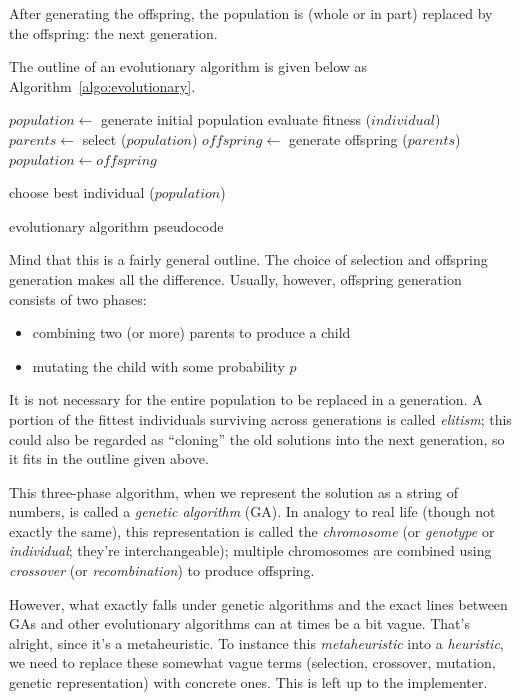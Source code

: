 \documentclass[times, utf8, diplomski]{fer}
\begin{document}
After generating the offspring, the population is (whole or in part) replaced
by the offspring: the next generation.

The outline of an evolutionary algorithm is given below as Algorithm~\ref{algo:evolutionary}.
\begin{algorithm}[!h]
    \begin{algorithmic}
        \STATE $\mathit{population} \gets$ generate initial population
        \REPEAT
                \STATE evaluate fitness ($\mathit{individual}$)
            \ENDFOR
            \STATE $\mathit{parents}    \gets$ select ($\mathit{population}$)
            \STATE $\mathit{offspring}  \gets$ generate offspring ($\mathit{parents}$)
            \STATE $\mathit{population} \gets  \mathit{offspring}$


        \RETURN choose best individual ($population$)
    \end{algorithmic}
    \caption{evolutionary algorithm pseudocode}
    \label{algo:evolutionary}
\end{algorithm}

Mind that this is a fairly general outline.
The choice of selection and offspring generation makes all the difference.
Usually, however, offspring generation consists of two phases:
\begin{itemize}
    \item combining two (or more) parents to produce a child
    \item mutating the child with some probability $p$
\end{itemize}
It is not necessary for the entire population to be replaced in a generation.
A portion of the fittest individuals surviving across generations is called
\emph{elitism}; this could also be regarded as ``cloning'' the old solutions into
the next generation, so it fits in the outline given above.

This three-phase algorithm, when we represent the solution as a string of numbers,
is called a \emph{genetic algorithm} (GA).
In analogy to real life (though not exactly the same), this representation is
called the \emph{chromosome} (or \emph{genotype} or \emph{individual}; they're
interchangeable); multiple chromosomes are combined using \emph{crossover}
(or \emph{recombination}) to produce offspring.

However, what exactly falls under genetic algorithms and the exact lines between
GAs and other evolutionary algorithms can at times be a bit vague. That's alright,
since it's a metaheuristic.
To instance this \emph{metaheuristic} into a \emph{heuristic}, we need to replace
these somewhat vague terms (selection, crossover, mutation, genetic representation)
with concrete ones. This is left up to the implementer.
\end{document}

